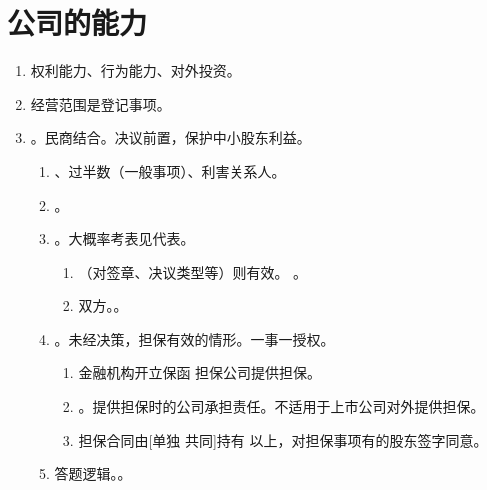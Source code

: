 \section{公司的能力}
\begin{enumerate}
  \item 权利能力、行为能力、对外投资。
  \item 经营范围是登记事项。
  \item {}。民商结合。决议前置，保护中小股东利益。
        \begin{enumerate}
          \item {}、过半数（一般事项）、利害关系人。
          \item {}。
          \item {}。大概率考表见代表。
                \begin{enumerate}
                  \item {}（对签章、决议类型等）则有效。
                        。
                  \item 双方。。
                \end{enumerate}
          \item {}。未经决策，担保有效的情形。一事一授权。
                \begin{enumerate}
                  \item 金融机构开立保函 \hz 担保公司提供担保。
                  \item {}。提供担保时的公司承担责任。\xjt 不适用于上市公司对外提供担保。
                  \item 担保合同由[单独 \hz 共同]持有  以上，对担保事项有的股东签字同意。
                \end{enumerate}
          \item 答题逻辑。。
        \end{enumerate}
\end{enumerate}
